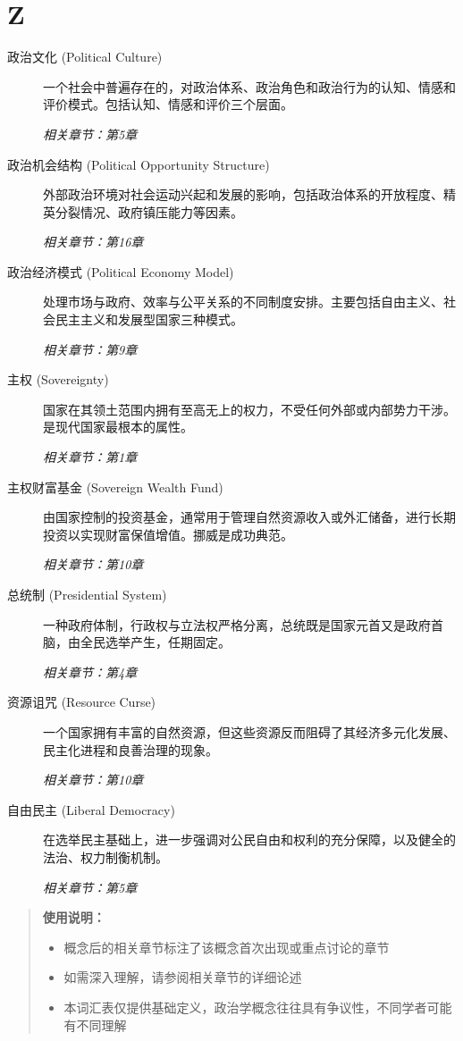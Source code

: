 \section{Z}
\begin{description}
    \item[政治文化 (Political Culture)] 一个社会中普遍存在的，对政治体系、政治角色和政治行为的认知、情感和评价模式。包括认知、情感和评价三个层面。 \par\textit{相关章节：第5章}
    \item[政治机会结构 (Political Opportunity Structure)] 外部政治环境对社会运动兴起和发展的影响，包括政治体系的开放程度、精英分裂情况、政府镇压能力等因素。 \par\textit{相关章节：第16章}
    \item[政治经济模式 (Political Economy Model)] 处理市场与政府、效率与公平关系的不同制度安排。主要包括自由主义、社会民主主义和发展型国家三种模式。 \par\textit{相关章节：第9章}
    \item[主权 (Sovereignty)] 国家在其领土范围内拥有至高无上的权力，不受任何外部或内部势力干涉。是现代国家最根本的属性。 \par\textit{相关章节：第1章}
    \item[主权财富基金 (Sovereign Wealth Fund)] 由国家控制的投资基金，通常用于管理自然资源收入或外汇储备，进行长期投资以实现财富保值增值。挪威是成功典范。 \par\textit{相关章节：第10章}
    \item[总统制 (Presidential System)] 一种政府体制，行政权与立法权严格分离，总统既是国家元首又是政府首脑，由全民选举产生，任期固定。 \par\textit{相关章节：第4章}
    \item[资源诅咒 (Resource Curse)] 一个国家拥有丰富的自然资源，但这些资源反而阻碍了其经济多元化发展、民主化进程和良善治理的现象。 \par\textit{相关章节：第10章}
    \item[自由民主 (Liberal Democracy)] 在选举民主基础上，进一步强调对公民自由和权利的充分保障，以及健全的法治、权力制衡机制。 \par\textit{相关章节：第5章}
\end{description}

\hrulefill

\begin{quote}
\textbf{使用说明：}
\begin{itemize}
    \item 概念后的相关章节标注了该概念首次出现或重点讨论的章节
    \item 如需深入理解，请参阅相关章节的详细论述
    \item 本词汇表仅提供基础定义，政治学概念往往具有争议性，不同学者可能有不同理解
\end{itemize}
\end{quote}
